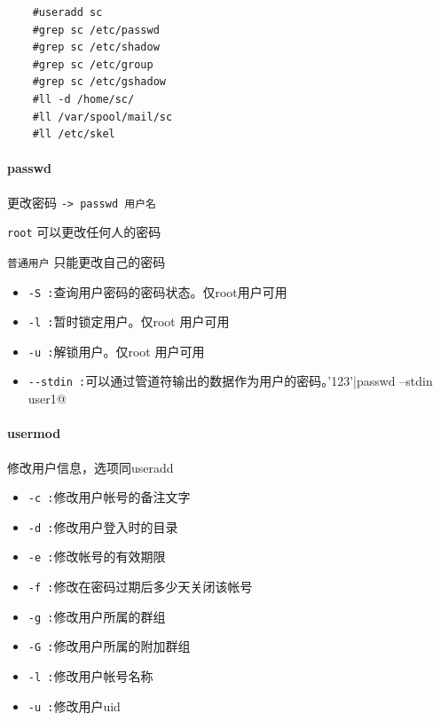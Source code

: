 \documentclass[UTF8,a4paper,12pt]{ctexbook}
\begin{document}
					\begin{lstlisting}
	#useradd sc
	#grep sc /etc/passwd
	#grep sc /etc/shadow
	#grep sc /etc/group
	#grep sc /etc/gshadow
	#ll -d /home/sc/
	#ll /var/spool/mail/sc
	#ll /etc/skel
					\end{lstlisting}
													
			\paragraph{passwd} 更改密码 \verb|-> passwd 用户名|
			
				\verb|root| 可以更改任何人的密码
				
				\verb|普通用户| 只能更改自己的密码
			
				\begin{itemize}[itemindent = 1em]
					\item \verb|-S :|查询用户密码的密码状态。仅root用户可用
					\item \verb|-l :|暂时锁定用户。仅root 用户可用
					\item \verb|-u :|解锁用户。仅root 用户可用
					\item \verb|--stdin :|可以通过管道符输出的数据作为用户的密码。\verb@echo '123'|passwd --stdin user1@
				\end{itemize}
				
			\paragraph{usermod} 修改用户信息，选项同useradd
				\begin{itemize}[itemindent = 1em]
					\item \verb|-c :|修改用户帐号的备注文字
					\item \verb|-d :|修改用户登入时的目录
					\item \verb|-e :|修改帐号的有效期限
					\item \verb|-f :|修改在密码过期后多少天关闭该帐号
					\item \verb|-g :|修改用户所属的群组
					\item \verb|-G :|修改用户所属的附加群组
					\item \verb|-l :|修改用户帐号名称
					\item \verb|-u :|修改用户uid
				\end{itemize}
				
\end{document}
